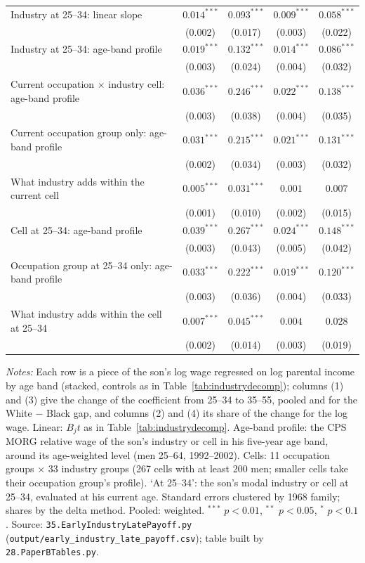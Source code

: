 \begin{table}[!htbp]
{{\begin{tabular}{lcccc}
Industry at 25--34: linear slope & $0.014^{***}$ & $0.093^{***}$ & $0.009^{***}$ & $0.058^{***}$ \\
 & (0.002) & (0.017) & (0.003) & (0.022) \\
Industry at 25--34: age-band profile & $0.019^{***}$ & $0.132^{***}$ & $0.014^{***}$ & $0.086^{***}$ \\
 & (0.003) & (0.024) & (0.004) & (0.032) \\
Current occupation $\times$ industry cell: age-band profile & $0.036^{***}$ & $0.246^{***}$ & $0.022^{***}$ & $0.138^{***}$ \\
 & (0.003) & (0.038) & (0.004) & (0.035) \\
Current occupation group only: age-band profile & $0.031^{***}$ & $0.215^{***}$ & $0.021^{***}$ & $0.131^{***}$ \\
 & (0.002) & (0.034) & (0.003) & (0.032) \\
\quad What industry adds within the current cell & $0.005^{***}$ & $0.031^{***}$ & $0.001$ & $0.007$ \\
 & (0.001) & (0.010) & (0.002) & (0.015) \\
Cell at 25--34: age-band profile & $0.039^{***}$ & $0.267^{***}$ & $0.024^{***}$ & $0.148^{***}$ \\
 & (0.003) & (0.043) & (0.005) & (0.042) \\
Occupation group at 25--34 only: age-band profile & $0.033^{***}$ & $0.222^{***}$ & $0.019^{***}$ & $0.120^{***}$ \\
 & (0.003) & (0.036) & (0.004) & (0.033) \\
\quad What industry adds within the cell at 25--34 & $0.007^{***}$ & $0.045^{***}$ & $0.004$ & $0.028$ \\
 & (0.002) & (0.014) & (0.003) & (0.019) \\
\bottomrule
\end{tabular}}}
\par\smallskip
\begin{minipage}{\textwidth}\footnotesize \textit{Notes:} Each row is a piece of the son's log wage regressed on log parental income by age band (stacked, controls as in Table~\ref{tab:industrydecomp}); columns (1) and (3) give the change of the coefficient from 25--34 to 35--55, pooled and for the White $-$ Black gap, and columns (2) and (4) its share of the change for the log wage. Linear: $B_j t$ as in Table~\ref{tab:industrydecomp}. Age-band profile: the CPS MORG relative wage of the son's industry or cell in his five-year age band, around its age-weighted level (men 25--64, 1992--2002). Cells: 11 occupation groups $\times$ 33 industry groups (267 cells with at least 200 men; smaller cells take their occupation group's profile). `At 25--34': the son's modal industry or cell at 25--34, evaluated at his current age. Standard errors clustered by 1968 family; shares by the delta method. Pooled: weighted. $^{***}$ $p<0.01$, $^{**}$ $p<0.05$, $^{*}$ $p<0.1$. Source: \texttt{35.EarlyIndustryLatePayoff.py} (\texttt{output/early\_industry\_late\_payoff.csv}); table built by \texttt{28.PaperBTables.py}.\end{minipage}
\end{table}
